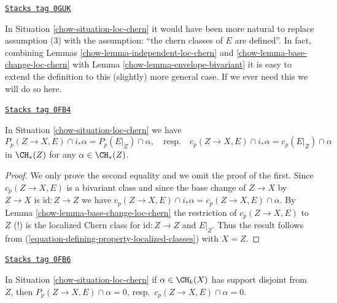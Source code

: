 \begin{remark}
\label{chow-remark-loc-chern}
\href{https://stacks.math.columbia.edu/tag/0GUK}{\texttt{Stacks tag 0GUK}}

In Situation \ref{chow-situation-loc-chern} it would have been more natural
to replace assumption (3) with the assumption: ``the chern classes
of $E$ are defined''. In fact, combining
Lemmas \ref{chow-lemma-independent-loc-chern} and
\ref{chow-lemma-base-change-loc-chern}
with Lemma \ref{chow-lemma-envelope-bivariant}
it is easy to extend the definition to this (slightly) more general case.
If we ever need this we will do so here.
\end{remark}

\begin{lemma}
\label{chow-lemma-loc-chern-after-pushforward}
\href{https://stacks.math.columbia.edu/tag/0FB4}{\texttt{Stacks tag 0FB4}}

In Situation \ref{chow-situation-loc-chern} we have
$$
P_p(Z \to X, E) \cap i_*\alpha = P_p(E|_Z) \cap \alpha,
\quad\text{resp.}\quad
c_p(Z \to X, E) \cap i_*\alpha = c_p(E|_Z) \cap \alpha
$$
in $\CH_*(Z)$ for any $\alpha \in \CH_*(Z)$.
\end{lemma}

\begin{proof}

We only prove the second equality and we omit the proof of the first.
Since $c_p(Z \to X, E)$ is a bivariant class and since the base
change of $Z \to X$ by $Z \to X$ is $\text{id} : Z \to Z$ we have
$c_p(Z \to X, E) \cap i_*\alpha = c_p(Z \to X, E) \cap \alpha$.
By Lemma \ref{chow-lemma-base-change-loc-chern} the restriction of
$c_p(Z \to X, E)$ to $Z$ (!) is the localized Chern class for
$\text{id} : Z \to Z$ and $E|_Z$. Thus the result follows from
(\ref{equation-defining-property-localized-classes}) with $X = Z$.
\end{proof}

\begin{lemma}
\label{chow-lemma-loc-chern-disjoint}
\href{https://stacks.math.columbia.edu/tag/0FB6}{\texttt{Stacks tag 0FB6}}

In Situation \ref{chow-situation-loc-chern}
if $\alpha \in \CH_k(X)$ has support disjoint from $Z$, then
$P_p(Z \to X, E) \cap \alpha = 0$, resp.\ $c_p(Z \to X, E) \cap \alpha = 0$.
\end{lemma}

